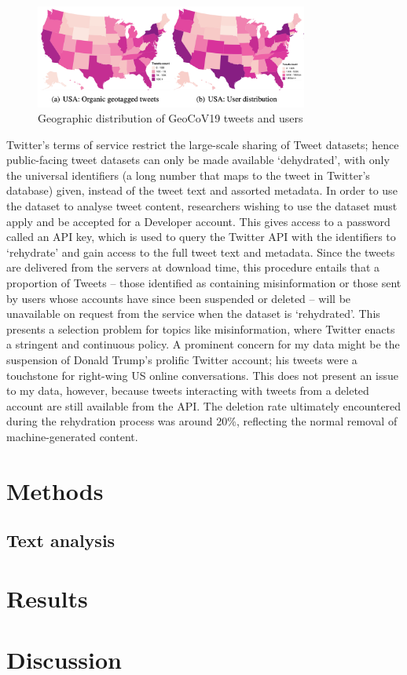 \documentclass{article}
\newcommand\wordcount{}
\begin{document}
\begin{figure}[h!]
    \includegraphics[width=0.8\textwidth]{figs/GeoCov-USdist.png}    
    \centering
    \caption{Geographic distribution of GeoCoV19 tweets and users \parencite{qaziGeoCoV19DatasetHundreds2020a}}
\end{figure}

Twitter's terms of service restrict the large-scale sharing of Tweet datasets; hence public-facing tweet datasets can only be made available `dehydrated', with only the universal identifiers (a long number that maps to the tweet in Twitter's database) given, instead of the tweet text and assorted metadata. In order to use the dataset to analyse tweet content, researchers wishing to use the dataset must apply and be accepted for a Developer account. This gives access to a password called an API key, which is used to query the Twitter API with the identifiers to `rehydrate' and gain access to the full tweet text and metadata. Since the tweets are delivered from the servers at download time, this procedure entails that a proportion of Tweets -- those identified as containing misinformation or those sent by users whose accounts have since been suspended or deleted -- will be unavailable on request from the service when the dataset is `rehydrated'. This presents a selection problem for topics like misinformation, where Twitter enacts a stringent and continuous policy. A prominent concern for my data might be the suspension of Donald Trump's prolific Twitter account; his tweets were a touchstone for right-wing US online conversations. This does not present an issue to my data, however, because tweets interacting with tweets from a deleted account are still available from the API. The deletion rate ultimately encountered during the rehydration process was around 20\%, reflecting the normal removal of machine-generated content.


\section{Methods}%
\subsection{Text analysis}\label{textan}


\section{Results}%

\section{Discussion} %

\wordcount
\printbibliography
\end{document}
